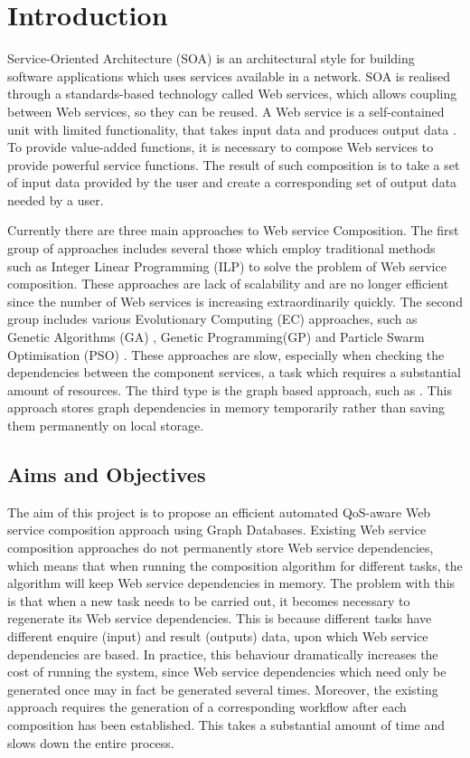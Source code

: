 \chapter{Introduction}\label{C:intro}
Service-Oriented Architecture (SOA) \cite{1} is an architectural style for building software applications which uses services available in a network. SOA is realised through a standards-based technology called Web services, which allows coupling between Web services, so they can be reused. A Web service is a self-contained unit with limited functionality, that takes input data and produces output data \cite{27}. To provide value-added functions, it is necessary to compose Web services to provide powerful service functions. The result of such composition is to take a set of input data provided by the user and create a corresponding set of output data needed by a user.  

Currently there are three main approaches to Web service Composition. The first group of approaches includes several those which employ traditional methods such as Integer Linear Programming (ILP) \cite{7} to solve the problem of Web service composition. These approaches are lack of scalability and are no longer efficient since the number of Web services is increasing extraordinarily quickly. The second group includes various Evolutionary Computing (EC) approaches, such as Genetic Algorithms (GA) \cite{8}, Genetic Programming(GP) \cite{14,2,9} and Particle Swarm Optimisation (PSO) \cite{10,19}. These approaches are slow, especially when checking the dependencies between the component services, a task which requires a substantial amount of resources. The third type is the graph based approach, such as \cite{13,5}. This approach stores graph dependencies in memory temporarily rather than saving them permanently on local storage.


\section{Aims and Objectives}
The aim of this project is to propose an efficient automated QoS-aware Web service composition approach using Graph Databases. Existing Web service composition approaches \cite{2, 4} do not permanently store Web service dependencies, which means that when running the composition algorithm for different tasks, the algorithm will keep Web service dependencies in memory. The problem with this is that when a new task needs to be carried out, it becomes necessary to regenerate its Web service dependencies. This is because different tasks have different enquire (input) and result (outputs) data, upon which Web service dependencies are based. In practice, this behaviour dramatically increases the cost of running the system, since Web service dependencies which need only be generated once may in fact be generated several times. Moreover, the existing approach requires the generation of a corresponding workflow after each composition has been established. This takes a substantial amount of time and slows down the entire process.


